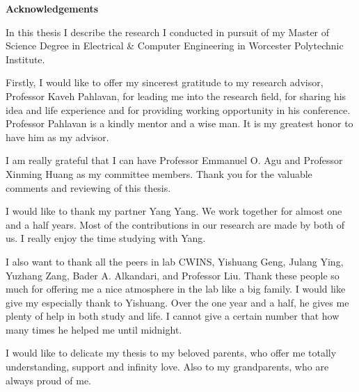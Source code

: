 \documentclass[12pt]{report}
\begin{document}


%
\begin{center}
	\textbf{Acknowledgements}
\end{center}

	In this thesis I describe the research I conducted in pursuit of my Master of Science Degree in Electrical \& Computer Engineering in Worcester Polytechnic Institute.

Firstly, I would like to offer my sincerest gratitude to my research advisor, Professor Kaveh Pahlavan, for leading me into the research field, for sharing his idea and life experience and for providing working opportunity in his conference. Professor Pahlavan is a kindly mentor and a wise man. It is my greatest honor to have him as my advisor. 

I am really grateful that I can have Professor Emmanuel O. Agu and Professor Xinming Huang as my committee members. Thank you for the valuable comments and reviewing of this thesis. 

I would like to thank my partner Yang Yang. We work together for almost one and a half years. Most of the contributions in our research are made by both of us. I really enjoy the time studying with Yang.

I also want to thank all the peers in lab CWINS, Yishuang Geng, Julang Ying, Yuzhang Zang, Bader A. Alkandari, and Professor Liu. Thank these people so much for offering me a nice atmosphere in the lab like a big family. I would like give my especially thank to Yishuang. Over the one year and a half, he gives me plenty of help in both study and life. I cannot give a certain number that how many times he helped me until midnight. 

I would like to delicate my thesis to my beloved parents, who offer me totally understanding, support and infinity love. Also to my grandparents, who are always proud of me.


\clearpage


\end{document}
